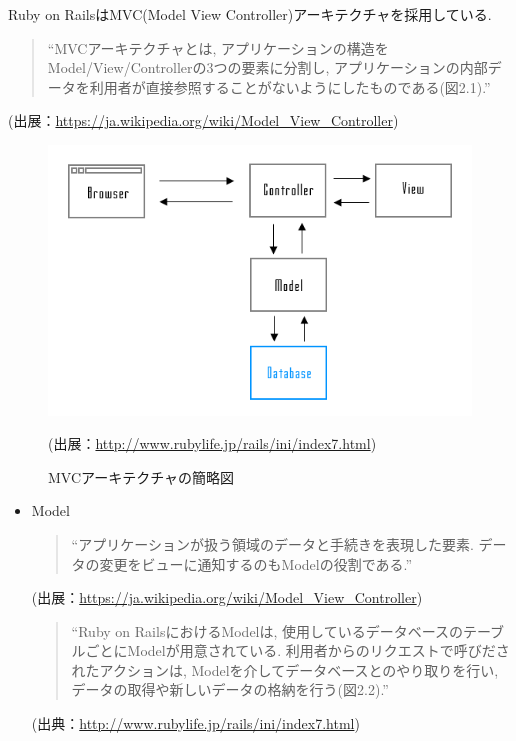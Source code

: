 \begin{description}
Ruby on RailsはMVC(Model View Controller)アーキテクチャを採用している.

\begin{quotation}
“MVCアーキテクチャとは, アプリケーションの構造をModel/View/Controllerの3つの要素に分割し, アプリケーションの内部データを利用者が直接参照することがないようにしたものである(図2.1).”
\end{quotation}
\begin{flushright}
(出展：\url{https://ja.wikipedia.org/wiki/Model_View_Controller})
\end{flushright}

\begin{figure}
\begin{center}
\includegraphics[width=13cm]{fig/mvc.png}
\caption{MVCアーキテクチャの簡略図}
\end{center}
\begin{flushright}
(出展：\url{http://www.rubylife.jp/rails/ini/index7.html})
\end{flushright}
\end{figure}

\begin{itemize}
\item Model

\begin{quotation}
“アプリケーションが扱う領域のデータと手続きを表現した要素.
データの変更をビューに通知するのもModelの役割である.”
\end{quotation}
\begin{flushright}
(出展：\url{https://ja.wikipedia.org/wiki/Model_View_Controller})
\end{flushright}

\begin{quotation}
“Ruby on RailsにおけるModelは, 使用しているデータベースのテーブルごとにModelが用意されている.
利用者からのリクエストで呼びだされたアクションは, Modelを介してデータベースとのやり取りを行い, データの取得や新しいデータの格納を行う(図2.2).”
\end{quotation}
\begin{flushright}
(出典：\url{http://www.rubylife.jp/rails/ini/index7.html})
\end{flushright}


\end{itemize}
\end{description}
